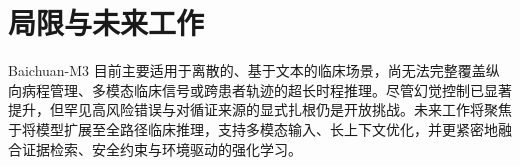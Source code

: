\section{局限与未来工作}

Baichuan-M3 目前主要适用于离散的、基于文本的临床场景，尚无法完整覆盖纵向病程管理、多模态临床信号或跨患者轨迹的超长时程推理。尽管幻觉控制已显著提升，但罕见高风险错误与对循证来源的显式扎根仍是开放挑战。未来工作将聚焦于将模型扩展至全路径临床推理，支持多模态输入、长上下文优化，并更紧密地融合证据检索、安全约束与环境驱动的强化学习。
